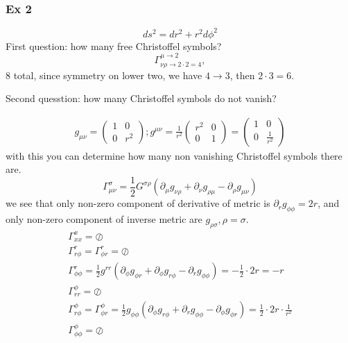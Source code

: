 \subsubsection{Ex 2}

\[
ds^{2} = dr^{2}+r^{2}d\phi ^{2}
\]
First question: how many free Christoffel symbols?
\[
\Gamma ^{\mu \to 2}_{\nu \rho \to 2\cdot 2 = 4}, 	
\]
8 total, since symmetry on lower two, we have $4 \to  3$, then $2\cdot3=6$.\par
Second quesstion: how many Christoffel symbols do not vanish?\par
\begin{gather*}
g_{\mu \nu } = \begin{pmatrix}
1 & 0 \\
0 & r^{2}
\end{pmatrix} ; g^{\mu \nu } = \frac{1}{r^{2}} \begin{pmatrix}
r^{2} & 0 \\
0 & 1
\end{pmatrix}  = \begin{pmatrix}
1 & 0 \\
0 & \frac{1}{r^{2}}
\end{pmatrix} 
\end{gather*}
with this you can determine how many non vanishing Christoffel symbols there are.
\[
\Gamma ^{\sigma }_{\mu \nu } = \frac{1}{2} G^{\sigma \rho }\left( \partial_{\mu }g_{\nu \rho }+\partial_{\nu }g_{\rho \mu }-\partial_{\rho }g_{\mu \nu } \right)
\]
we see that only non-zero component of derivative of metric is $\partial_{r}g_{\phi \phi } = 2r$, and only non-zero component of inverse metric are $g_{\rho \sigma }, \rho =\sigma $.
\begin{gather*}
\Gamma ^{x}_{xx} = \oslash \\
\Gamma ^{r}_{r\phi } = \Gamma ^{r}_{\phi r} = \oslash\\
\Gamma ^{r}_{\phi \phi } = \frac{1}{2}g^{rr}\left( \partial_{\phi }g_{\phi r} + \partial_{\phi }g_{r\phi }-\partial_{r}g_{\phi \phi } \right) = -\frac{1}{2}\cdot 2r = -r\\
\Gamma ^{\phi }_{rr } = \oslash\\
\Gamma ^{\phi }_{r\phi } = \Gamma ^{\phi }_{\phi r} = \frac{1}{2}g_{\phi \phi } \left( \partial_{\phi }g_{r\phi } + \partial_{r}g_{\phi \phi }-\partial_{\phi }g_{\phi r} \right) = \frac{1}{2}\cdot 2r\cdot \frac{1}{r^{2}}\\
\Gamma ^{\phi }_{\phi \phi } = \oslash
\end{gather*}

